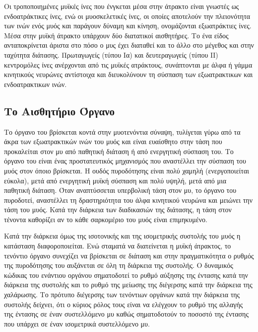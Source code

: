 Οι τροποποιημένες μυϊκές ίνες που ένγκεται μέσα στην άτρακτο είναι γνωστές ως ενδοατράκτικες ίνες, ενώ οι μυοσκελετικές ίνες, οι οποίες αποτελούν την πλειονότητα των ινών ενός μυός και παράγουν δύναμη και κίνηση, ονομάζονται εξωατράκτιες ίνες. Μέσα στην μυϊκή άτρακτο υπάρχουν δύο διατατικοί αισθητήρες. Το ένα είδος ανταποκρίνεται άριστα στο πόσο ο μυς έχει διαταθεί και το άλλο στο μέγεθος και στην ταχύτητα διάτασης. Πρωταγωγείς (τύπου Ια) και δευτεραγωγείς (τύπου ΙΙ) κεντρομόλες ίνες ανέρχονται από τις μυϊκές ατράκτους, συνάπτονται με άλφα ή γάμμα κινητικούς νευρώνες αντίστοιχα και διευκολύνουν τη σύσπαση των εξωατρακτικων και ενδοατρακτικων ινών.

\subsection{\texorpdfstring{Το Αισθητήριο Όργανο }{}}

Το όργανο του  βρίσκεται κοντά στην μυοτενόντια σύναψη, τυλίγεται γύρω από τα άκρα των εξωατρακτικών ινών του μυός και είναι ευαίσθητο στην τάση που προκαλείται στον μυ από παθητική διάταση ή από ενεργητική σύσπαση του. Το όργανο του  είναι ένας προστατευτικός μηχανισμός που αναστέλλει την σύσπαση του μυός στον όποιο βρίσκεται. Η ουδός πυροδότησης είναι πολύ χαμηλή (ενεργοποιείται εύκολα), μετά από ενεργητική μυϊκή σύσπαση και πολύ υψηλή, μετά από μια παθητική διάταση. Όταν αναπτύσσεται υπερβολική τάση στον μυ, το όργανο του  πυροδοτεί, αναστέλλει τη δραστηριότητα του άλφα κινητικού νευρώνα και μειώνει την τάση του μυός. Κατά την διάρκεια των διαδικασιών της διάτασης, η τάση στον τένοντα καθορίζει αν το κάθε σαρκομέριο του μυός είναι επιμηκυμένο.

Κατά την διάρκεια όμως της ισοτονικής και της ισομετρικής συστολής του μυός η κατάσταση διαφοροποιείται. Ενώ σταματά να διατείνεται η μυϊκή άτρακτος, το τενόντιο όργανο συνεχίζει να βρίσκεται σε διάταση και στην πραγματικότητα ο ρυθμός της πυροδότησης του αυξάνεται σε όλη τη διάρκεια της συστολής. Ο δυναμικός κώδικας του ενάντιου οργάνου σηματοδοτεί το ρυθμό αύξησης της έντασης κατά την διάρκεια της συστολής και το ρυθμό της μείωσης της διέγερσης κατά την διάρκεια της χαλάρωσης. Το πρότυπο διέγερσης των τενόντιων οργάνων κατά την διάρκεια της συστολής δείχνει, ότι ο κύριος ρόλος τους είναι να ελέγχουν το ρυθμό της αλλαγής της έντασης σε έναν συστελλόμενο μυ καθώς σηματοδοτούν το ποσοστό της έντασης που υπάρχει σε έναν ισομετρικά συστελλόμενο μυ.

